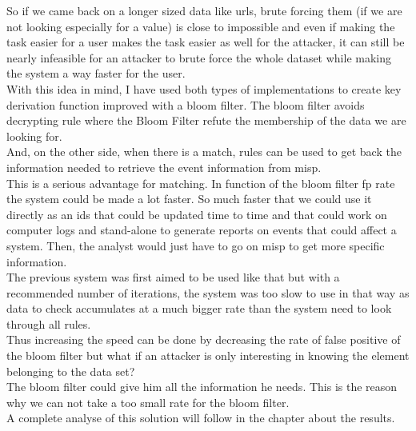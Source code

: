 \documentclass{eplmastersthesis}
\begin{document}
So if we came back on a longer sized data like \gls{url}s, brute forcing them (if we are not looking especially for a value) is close to impossible and even if making the task easier for a user makes the task easier as well for the attacker, it can still be nearly infeasible for an attacker to brute force the whole dataset while making the system a way faster for the user.\\

With this idea in mind, I have used both types of implementations to create key derivation function improved with a bloom filter. The bloom filter avoids decrypting rule where the Bloom Filter refute the membership of the data we are looking for. \\
And, on the other side, when there is a match, rules can be used to get back the information needed to retrieve the event information from \gls{misp}.\\

This is a serious advantage for matching. In function of the bloom filter \gls{fp} rate the system could be made a lot faster. So much faster that we could use it directly as an \gls{ids} that could be updated time to time and that could work on computer logs and  stand-alone to generate reports on events that could affect a system. Then, the analyst would just have to go on \gls{misp} to get more specific information.\\
The previous system was first aimed to be used like that but with a recommended number of iterations, the system was too slow to use in that way as data to check accumulates at a much bigger rate than the system need to look through all rules.\\

Thus increasing the speed can be done by decreasing the rate of false positive of the bloom filter but what if an attacker is only interesting in knowing the element belonging to the data set?\\
The bloom filter could give him all the information he needs. This is the reason why we can not take a too small rate for the bloom filter.\\

A complete analyse of this solution will follow in the chapter about the results.
\end{document}
